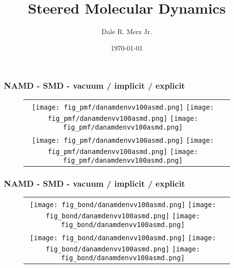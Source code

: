 \documentclass[9pt]{beamer} %
\title[]{Steered Molecular Dynamics}
\author{Dale R. Merz Jr.}
\institute[Ga Tech]
{ Georgia Institute of Technology \\
  \medskip {\emph{dmerz3@gatech.edu}} }
\date{\today}
\begin{document}
\begin{frame}
\frametitle{NAMD - SMD - vacuum / implicit / explicit}
{}
\begin{figure}
\begin{tabular}{cc}
\hspace*{-1cm}
\texttt{[image: fig\_pmf/danamdenvv100asmd.png]}
\texttt{[image: fig\_pmf/danamdenvv100asmd.png]}
\texttt{[image: fig\_pmf/danamdenvv100asmd.png]} \\
\hspace*{-1cm}
\texttt{[image: fig\_pmf/danamdenvv100asmd.png]}
\texttt{[image: fig\_pmf/danamdenvv100asmd.png]}
\texttt{[image: fig\_pmf/danamdenvv100asmd.png]} \\
\end{tabular}
\end{figure}
\end{frame}
\begin{frame}
\frametitle{NAMD - SMD - vacuum / implicit / explicit}
{}
\begin{figure}
\begin{tabular}{cc}
\hspace*{-1cm}
\texttt{[image: fig\_bond/danamdenvv100asmd.png]}
\texttt{[image: fig\_bond/danamdenvv100asmd.png]}
\texttt{[image: fig\_bond/danamdenvv100asmd.png]} \\
\hspace*{-1cm}
\texttt{[image: fig\_bond/danamdenvv100asmd.png]}
\texttt{[image: fig\_bond/danamdenvv100asmd.png]}
\texttt{[image: fig\_bond/danamdenvv100asmd.png]} \\
\end{tabular}
\end{figure}
\end{frame}
%
% 
\end{document}
